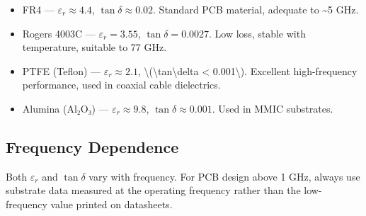 
				
\begin{itemize}

					\item FR4 — $\varepsilon_r \approx 4.4$, $\tan\delta \approx 0.02$. Standard PCB material, adequate to \textasciitilde{}5 GHz.

					\item Rogers 4003C — $\varepsilon_r = 3.55$, $\tan\delta = 0.0027$. Low loss, stable with temperature, suitable to 77 GHz.

					\item PTFE (Teflon) — $\varepsilon_r \approx 2.1$, \textbackslash{}(\textbackslash{}tan\textbackslash{}delta \textless{} 0.001\textbackslash{}). Excellent high-frequency performance, used in coaxial cable dielectrics.

					\item Alumina (Al₂O₃) — $\varepsilon_r \approx 9.8$, $\tan\delta \approx 0.001$. Used in MMIC substrates.

				
\end{itemize}

				

\subsection{Frequency Dependence}

				

Both $\varepsilon_r$ and $\tan\delta$ vary with frequency. For PCB design above 1 GHz, always use substrate data measured at the operating frequency rather than the low-frequency value printed on datasheets.



